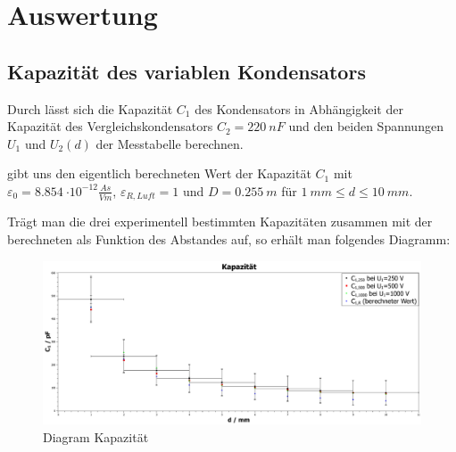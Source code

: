 \chapter{Auswertung}
\section{Kapazität des variablen Kondensators}
Durch  lässt sich die Kapazität $ C_{1} $ des Kondensators in Abhängigkeit der Kapazität des Vergleichskondensators $ C_{2}=\SI{220}{nF}$
und den beiden Spannungen $ U_1 $ und $ U_2(d) $
der Messtabelle  berechnen.\par
{} gibt uns den eigentlich berechneten Wert der Kapazität $ C_{1} $ mit $\varepsilon_{0}=\SI{8,854}{\cdot 10^{-12}\frac{As}{Vm}}$,
$ \varepsilon_{R,Luft}=1 $ und $ D=\SI{0,255}{m} $ für $ \SI{1}{mm} \leq d \leq \SI{10}{mm} $.\par
Trägt man die drei experimentell bestimmten Kapazitäten zusammen mit der berechneten als Funktion des Abstandes auf, so erhält man
folgendes Diagramm:\par
\begin{figure}[h]
    \centering
    \includegraphics[width=.95\textwidth]{diagramme/Kapazitaet.pdf}
    \caption[Diagram Kapazität]{Diagram Kapazität}
    \label{fig:farad}
\end{figure}
%
